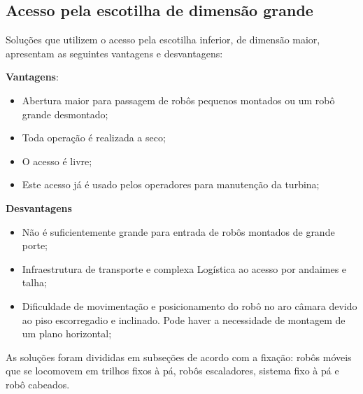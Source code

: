 \subsection{Acesso pela escotilha de dimensão grande}
Soluções que utilizem o acesso pela escotilha inferior, de dimensão maior,
apresentam as seguintes vantagens e desvantagens:

\textbf{Vantagens}:
\begin{itemize}
  \item Abertura maior para passagem de robôs pequenos montados ou um robô
  grande desmontado;
  \item Toda operação é realizada a seco;
  \item O acesso é livre;
  \item Este acesso já é usado pelos operadores para manutenção da turbina;
\end{itemize}

\textbf{Desvantagens}
\begin{itemize}
  \item Não é suficientemente grande para entrada de robôs montados de grande
  porte;
  \item Infraestrutura de transporte e complexa Logística ao acesso por
  andaimes e talha;
  \item Dificuldade de movimentação e posicionamento do robô no aro câmara
  devido ao piso escorregadio e inclinado. Pode haver a necessidade de montagem
  de um plano horizontal; 
\end{itemize}

As soluções foram divididas em subseções de acordo com a fixação: robôs móveis
que se locomovem em trilhos fixos à pá, robôs escaladores, sistema fixo à pá e
robô cabeados. 




 
